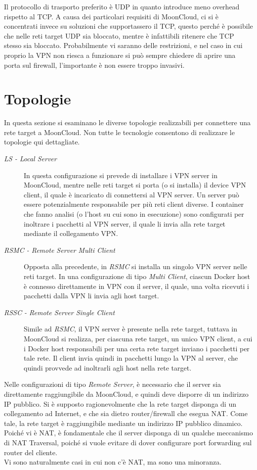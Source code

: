 Il protocollo di trasporto preferito è UDP in quanto introduce meno overhead rispetto al TCP. A causa
dei particolari requisiti di MoonCloud, ci si è concentrati invece su soluzioni che
supportassero il TCP, questo perché è possibile che nelle reti target UDP sia bloccato,
mentre è infattibili ritenere che TCP stesso sia bloccato. Probabilmente vi saranno
delle restrizioni, e nel caso in cui proprio la VPN non riesca a funzionare si può sempre
chiedere di aprire una porta sul firewall, l'importante è non essere troppo invasivi.


\section{Topologie}
In questa sezione si esaminano le diverse topologie realizzabili per connettere una rete
target a MoonCloud. Non tutte le tecnologie consentono di realizzare le topologie qui
dettagliate.
\begin{description}
  \item[\textit{LS - Local Server}]In questa configurazione si prevede di installare i
  VPN server in MoonCloud, mentre nelle reti target si porta (o si installa) il device
  VPN client, il quale è incaricato di connettersi al VPN server. Un server può essere
  potenzialmente responsabile per più reti client diverse. I container che fanno analisi
  (o l'host su cui sono in esecuzione)
  sono configurati per inoltrare i pacchetti al VPN server, il quale li invia alla rete
  target mediante il collegamento VPN.
  \item[\textit{RSMC - Remote Server Multi Client}]Opposta alla precedente, in \textit{RSMC}
  si installa un singolo VPN server nelle reti target. In una configurazione di tipo
  \textit{Multi Client}, ciascun Docker host è connesso direttamente in VPN con il server, il
  quale, una volta ricevuti i pacchetti dalla VPN li invia agli host target.
  \item[\textit{RSSC - Remote Server Single Client}]Simile ad \textit{RSMC}, il VPN
  server è presente nella rete target, tuttava in MoonCloud si realizza, per ciascuna rete
  target, un unico VPN client, a cui i Docker host responsabili per una certa rete target inviano
  i pacchetti per tale rete. Il client invia quindi in pacchetti lungo la VPN al server,
  che quindi provvede ad inoltrarli agli host nella rete target.
\end{description}
Nelle configurazioni di tipo \textit{Remote Server}, è necessario che il server sia
direttamente raggiungibile da MoonCloud, e quindi deve disporre di un indirizzo IP pubblico.
Si è supposto ragionevolmente che la rete target disponga di un collegamento ad Internet, e che
sia dietro router/firewall che esegua NAT. Come tale, la rete target è raggiungibile
mediante un indirizzo IP pubblico dinamico. Poiché vi è NAT, è fondamentale che il server disponga
di un qualche meccanismo di NAT Traversal, poiché si vuole evitare di dover configurare
port forwarding sul router del cliente.\\
Vi sono naturalmente casi in cui non c'è NAT, ma sono una minoranza.


